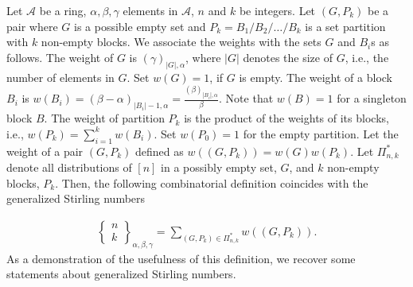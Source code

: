 \documentclass[12pt, reqno]{amsart}
\newtheorem{proof 1}{proof 1}
\def\sts#1#2{\begin{Bmatrix}
#1 \\ #2 \end{Bmatrix}}
\begin{document}
Let $\mathcal{A}$ be a ring, $\alpha, \beta, \gamma$ elements in $\mathcal{A}$, $n$ and $k$ be integers. Let $(G, P_k)$ be a pair where $G$ is a possible empty set and $P_k=B_1/B_2/\ldots/B_k$ is a set partition with $k$ non-empty blocks. We associate the weights with the sets $G$ and $B_i$s as follows. The weight of $G$ is $(\gamma)_{|G|,\alpha}$, where $|G|$ denotes the size of $G$, i.e., the number of elements in $G$. Set $w(G)=1$, if $G$ is empty. The weight of a block $B_i$ is $w(B_i) = (\beta-\alpha)_{|B_{i}|-1,\alpha} = \frac{(\beta)_{|B_i|,\alpha}}{\beta}$. Note that $w(B) =1$ for a singleton block $B$. The weight of partition $P_k$ is the product of the weights of its blocks, i.e., $w(P_k)=\sum_{i=1}^{k} w(B_i)$. Set $w(P_0)=1$ for the empty partition. Let the weight of a pair $(G,P_k)$ defined as $w((G,P_k)) = w(G)w(P_k)$.
 Let $\Pi^*_{n,k}$  denote all distributions of $[n]$ in a possibly empty set, $G$,  and $k$ non-empty blocks, $P_k$. Then, the following combinatorial definition coincides with the generalized Stirling numbers 

\begin{align*}
\sts{n}{k}_{\alpha,\beta,\gamma} = \sum_{(G,P_k)\in \Pi^*_{n,k}} w((G,P_k)).
\end{align*}
As a demonstration of the usefulness of this definition, we recover some  statements about generalized Stirling numbers. 
\end{document}
